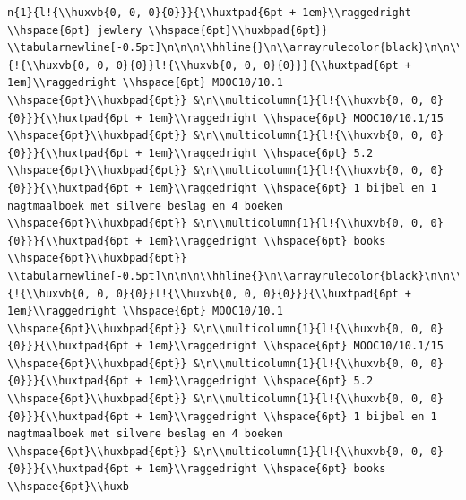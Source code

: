\documentclass[11pt,preprint, authoryear]{elsarticle}
\numberwithin{equation}{section}
\numberwithin{figure}{section}
\numberwithin{table}{section}
\begin{document}
\begin{verbatim}
n{1}{l!{\\huxvb{0, 0, 0}{0}}}{\\huxtpad{6pt + 1em}\\raggedright \\hspace{6pt} jewlery \\hspace{6pt}\\huxbpad{6pt}} \\tabularnewline[-0.5pt]\n\n\n\\hhline{}\n\\arrayrulecolor{black}\n\n\\multicolumn{1}{!{\\huxvb{0, 0, 0}{0}}l!{\\huxvb{0, 0, 0}{0}}}{\\huxtpad{6pt + 1em}\\raggedright \\hspace{6pt} MOOC10/10.1 \\hspace{6pt}\\huxbpad{6pt}} &\n\\multicolumn{1}{l!{\\huxvb{0, 0, 0}{0}}}{\\huxtpad{6pt + 1em}\\raggedright \\hspace{6pt} MOOC10/10.1/15 \\hspace{6pt}\\huxbpad{6pt}} &\n\\multicolumn{1}{l!{\\huxvb{0, 0, 0}{0}}}{\\huxtpad{6pt + 1em}\\raggedright \\hspace{6pt} 5.2 \\hspace{6pt}\\huxbpad{6pt}} &\n\\multicolumn{1}{l!{\\huxvb{0, 0, 0}{0}}}{\\huxtpad{6pt + 1em}\\raggedright \\hspace{6pt} 1 bijbel en 1 nagtmaalboek met silvere beslag en 4 boeken \\hspace{6pt}\\huxbpad{6pt}} &\n\\multicolumn{1}{l!{\\huxvb{0, 0, 0}{0}}}{\\huxtpad{6pt + 1em}\\raggedright \\hspace{6pt} books \\hspace{6pt}\\huxbpad{6pt}} \\tabularnewline[-0.5pt]\n\n\n\\hhline{}\n\\arrayrulecolor{black}\n\n\\multicolumn{1}{!{\\huxvb{0, 0, 0}{0}}l!{\\huxvb{0, 0, 0}{0}}}{\\huxtpad{6pt + 1em}\\raggedright \\hspace{6pt} MOOC10/10.1 \\hspace{6pt}\\huxbpad{6pt}} &\n\\multicolumn{1}{l!{\\huxvb{0, 0, 0}{0}}}{\\huxtpad{6pt + 1em}\\raggedright \\hspace{6pt} MOOC10/10.1/15 \\hspace{6pt}\\huxbpad{6pt}} &\n\\multicolumn{1}{l!{\\huxvb{0, 0, 0}{0}}}{\\huxtpad{6pt + 1em}\\raggedright \\hspace{6pt} 5.2 \\hspace{6pt}\\huxbpad{6pt}} &\n\\multicolumn{1}{l!{\\huxvb{0, 0, 0}{0}}}{\\huxtpad{6pt + 1em}\\raggedright \\hspace{6pt} 1 bijbel en 1 nagtmaalboek met silvere beslag en 4 boeken \\hspace{6pt}\\huxbpad{6pt}} &\n\\multicolumn{1}{l!{\\huxvb{0, 0, 0}{0}}}{\\huxtpad{6pt + 1em}\\raggedright \\hspace{6pt} books \\hspace{6pt}\\huxb
\end{verbatim}
\end{document}
